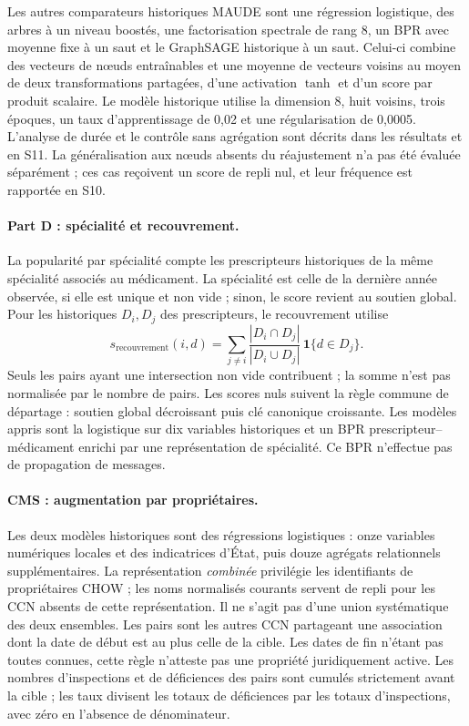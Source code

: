 Les autres comparateurs historiques MAUDE sont une régression logistique, des arbres à un niveau boostés, une factorisation spectrale de rang 8, un BPR avec moyenne fixe à un saut et le GraphSAGE historique à un saut\cite{hamilton2017,rendle2009,hgbcode}. Celui-ci combine des vecteurs de nœuds entraînables et une moyenne de vecteurs voisins au moyen de deux transformations partagées, d'une activation $\tanh$ et d'un score par produit scalaire. Le modèle historique utilise la dimension 8, huit voisins, trois époques, un taux d'apprentissage de 0,02 et une régularisation de 0,0005. L'analyse de durée et le contrôle sans agrégation sont décrits dans les résultats et en S11. La généralisation aux nœuds absents du réajustement n'a pas été évaluée séparément ; ces cas reçoivent un score de repli nul, et leur fréquence est rapportée en S10.

\paragraph{Part D : spécialité et recouvrement.} La popularité par spécialité compte les prescripteurs historiques de la même spécialité associés au médicament. La spécialité est celle de la dernière année observée, si elle est unique et non vide ; sinon, le score revient au soutien global. Pour les historiques $D_i,D_j$ des prescripteurs, le recouvrement utilise
\begin{equation}
 s_{\mathrm{recouvrement}}(i,d)=\sum_{j\ne i}\frac{|D_i\cap D_j|}{|D_i\cup D_j|}\,\mathbf{1}\{d\in D_j\}.
\end{equation}
Seuls les pairs ayant une intersection non vide contribuent ; la somme n'est pas normalisée par le nombre de pairs. Les scores nuls suivent la règle commune de départage : soutien global décroissant puis clé canonique croissante. Les modèles appris sont la logistique sur dix variables historiques et un BPR prescripteur--médicament enrichi par une représentation de spécialité. Ce BPR n'effectue pas de propagation de messages\cite{hgbcode,hgbpartd}.

\paragraph{CMS : augmentation par propriétaires.} Les deux modèles historiques sont des régressions logistiques : onze variables numériques locales et des indicatrices d'État, puis douze agrégats relationnels supplémentaires. La représentation \emph{combinée} privilégie les identifiants de propriétaires CHOW ; les noms normalisés courants servent de repli pour les CCN absents de cette représentation. Il ne s'agit pas d'une union systématique des deux ensembles. Les pairs sont les autres CCN partageant une association dont la date de début est au plus celle de la cible. Les dates de fin n'étant pas toutes connues, cette règle n'atteste pas une propriété juridiquement active. Les nombres d'inspections et de déficiences des pairs sont cumulés strictement avant la cible ; les taux divisent les totaux de déficiences par les totaux d'inspections, avec zéro en l'absence de dénominateur\cite{hgbcode}.

